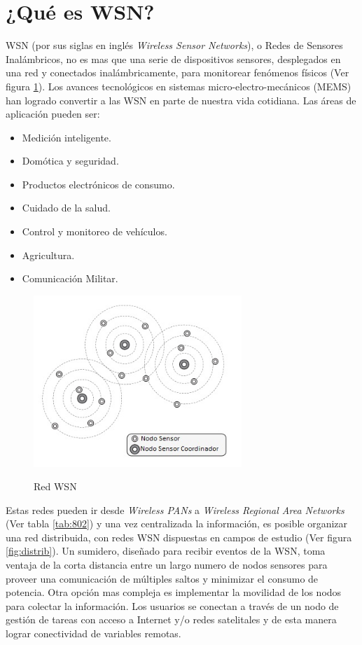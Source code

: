 \section{¿Qué es WSN?}
\label{sec:wsn}

WSN (por sus siglas en inglés \textit{Wireless Sensor Networks}), o Redes de Sensores Inalámbricos, no es mas que una serie de dispositivos sensores, desplegados en una red y conectados inalámbricamente, para monitorear fenómenos físicos (Ver figura \ref{fig:wsn}). Los avances tecnológicos en sistemas micro-electro-mecánicos (MEMS) han logrado convertir a las WSN en parte de nuestra vida cotidiana. Las áreas de aplicación pueden ser:
		\begin{itemize}
			\item Medición inteligente.
			\item Domótica y seguridad.
			\item Productos electrónicos de consumo.
			\item Cuidado de la salud.
			\item Control y monitoreo de vehículos.
			\item Agricultura.
			\item Comunicación Militar.
		\end{itemize}
		
 \begin{figure}[h!]
	\centering
    \includegraphics[width=0.7\textwidth]{./Figures/WSN.jpg}
	\label{fig:wsn}
	\caption{Red WSN}
\end{figure}
		
Estas redes pueden ir desde \textit{Wireless PANs} a \textit{Wireless Regional Area Networks} (Ver tabla \ref{tab:802}) y una vez centralizada la información, es posible organizar una red distribuida, con redes WSN dispuestas en campos de estudio (Ver figura \ref{fig:distrib}). Un sumidero, diseñado para recibir eventos de la WSN, toma ventaja de la corta distancia entre un largo numero de nodos sensores para proveer una comunicación de múltiples saltos y minimizar el consumo de potencia. Otra opción mas compleja es implementar la movilidad de los nodos para colectar la información. Los usuarios se conectan a través de un nodo de gestión de tareas con acceso a Internet y/o redes satelitales y de esta manera lograr conectividad de variables remotas.

